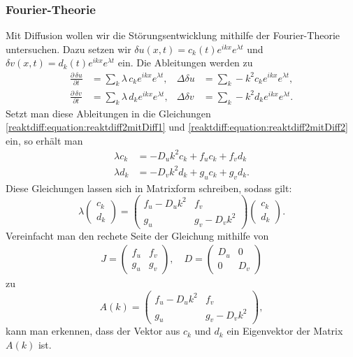 \subsubsection{Fourier-Theorie}
Mit Diffusion wollen wir die Störungsentwicklung mithilfe der Fourier-Theorie untersuchen.
Dazu setzen wir \(\delta u(x,t) = c_k(t) e^{ikx} e^{\lambda t}\) und \(\delta v(x,t) = d_k(t) e^{ikx} e^{\lambda t}\) ein.
Die Ableitungen werden zu
\begin{align*}
    \frac{\partial\,\delta u}{\partial t} &= \sum_k \lambda\, c_k e^{i k x} e^{\lambda t}, &
    \Delta \delta u &= \sum_k -k^2 c_k e^{i k x} e^{\lambda t},\\
    \frac{\partial\,\delta v}{\partial t} &= \sum_k \lambda\, d_k e^{i k x} e^{\lambda t}, &
    \Delta \delta v &= \sum_k -k^2 d_k e^{i k x} e^{\lambda t}.
\end{align*}
Setzt man diese Ableitungen in die Gleichungen \eqref{reaktdiff:equation:reaktdiff2mitDiff1} und \eqref{reaktdiff:equation:reaktdiff2mitDiff2} ein, so erhält man
    \begin{align*}
        \lambda c_k &= -D_u k^2 c_k + f_u c_k + f_v d_k \\
        \lambda d_k &= -D_v k^2 d_k + g_u c_k + g_v d_k.
    \end{align*}
Diese Gleichungen lassen sich in Matrixform schreiben, sodass gilt:
\begin{equation*}
    \lambda
    \begin{pmatrix}
    c_k \\
    d_k
    \end{pmatrix}
    =
    \begin{pmatrix}
        f_u - D_u k^2 & f_v \\
        g_u & g_v - D_v k^2
    \end{pmatrix}
    \begin{pmatrix}
    c_k \\
    d_k
    \end{pmatrix}.
\end{equation*}
Vereinfacht man den rechete Seite der Gleichung mithilfe von 
\begin{align*}
    J =
    \begin{pmatrix}
        f_u & f_v\\
        g_u & g_v
    \end{pmatrix}, \quad
    D =
    \begin{pmatrix}
        D_u & 0\\
        0 & D_v
    \end{pmatrix}
\end{align*}
zu 
\begin{equation*}
    A(k) =
    \begin{pmatrix}
        f_u - D_u k^2 & f_v\\
        g_u & g_v - D_v k^2
    \end{pmatrix},
\end{equation*}
kann man erkennen, dass der Vektor aus \(c_k\) und \(d_k\) ein Eigenvektor der Matrix \(A(k)\) ist.


